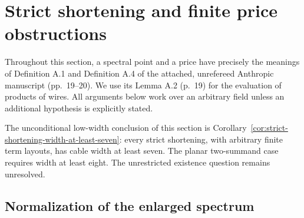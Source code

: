 \section{Strict shortening and finite price obstructions}
\label{sec:shortening-prices}

Throughout this section, a spectral point and a price have precisely the
meanings of Definition A.1 and Definition A.4 of the attached, unrefereed
Anthropic manuscript (pp.~19--20).  We use its Lemma A.2 (p.~19) for the
evaluation of products of wires.  All arguments below work over an arbitrary
field unless an additional hypothesis is explicitly stated.

The unconditional low-width conclusion of this section is
Corollary~\ref{cor:strict-shortening-width-at-least-seven}:
every strict shortening, with arbitrary finite term layouts,
has cable width at least seven.  The planar two-summand
case requires width at least eight.  The unrestricted
existence question remains unresolved.

\subsection{Normalization of the enlarged spectrum}

